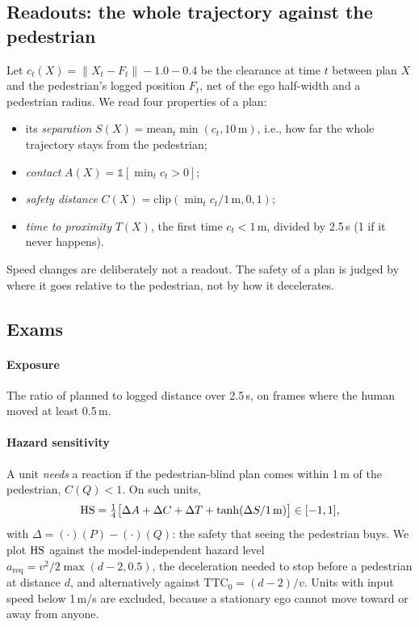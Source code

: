\subsection{Readouts: the whole trajectory against the pedestrian}
Let $c_t(X)=\|X_t-F_t\|-1.0-0.4$ be the clearance at time $t$ between plan $X$ and the pedestrian's
logged position $F_t$, net of the ego half-width and a pedestrian radius. We read four properties of a
plan:
\begin{itemize}
\item its \emph{separation} $S(X)=\mathrm{mean}_t\min(c_t,10\,\mathrm{m})$, i.e., how far the whole
      trajectory stays from the pedestrian;
\item \emph{contact} $A(X)=\mathbb{1}[\min_t c_t>0]$;
\item \emph{safety distance} $C(X)=\mathrm{clip}(\min_t c_t/1\,\mathrm{m},0,1)$;
\item \emph{time to proximity} $T(X)$, the first time $c_t<1$\,m, divided by 2.5\,s (1 if it never
      happens).
\end{itemize}
Speed changes are deliberately not a readout. The safety of a plan is judged by where it goes relative
to the pedestrian, not by how it decelerates.

\subsection{Exams}
\paragraph{Exposure}
The ratio of planned to logged distance over 2.5\,s, on frames where the human moved at least 0.5\,m.

\paragraph{Hazard sensitivity}
A unit \emph{needs} a reaction if the pedestrian-blind plan comes within 1\,m of the pedestrian,
$C(Q)<1$. On such units,
\begin{equation}
\mathrm{HS}=\tfrac14\big[\Delta A+\Delta C+\Delta T+\tanh(\Delta S/1\,\mathrm{m})\big]\in[-1,1],
\end{equation}
with $\Delta=(\cdot)(P)-(\cdot)(Q)$: the safety that seeing the pedestrian buys. We plot $\mathrm{HS}$
against the model-independent hazard level $a_{\mathrm{req}}=v^2/2\max(d-2,0.5)$, the deceleration
needed to stop before a pedestrian at distance $d$, and alternatively against $\mathrm{TTC}_0=(d-2)/v$.
Units with input speed below 1\,m/s are excluded, because a stationary ego cannot move toward or away
from anyone.

